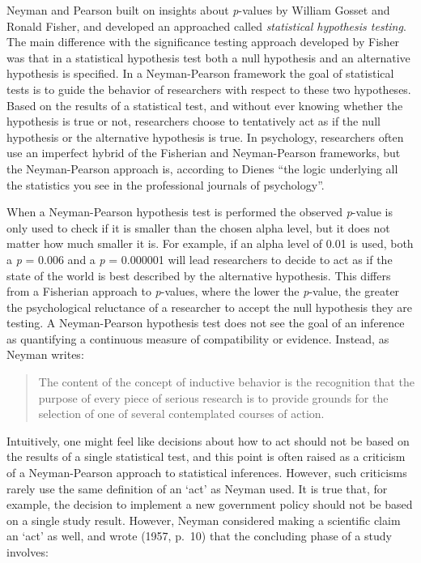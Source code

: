 \documentclass[
  oneside]{book}
\begin{document}
Neyman and Pearson built on insights about \emph{p}-values by William Gosset and Ronald Fisher, and developed an approached called \emph{statistical hypothesis testing}. The main difference with the significance testing approach developed by Fisher was that in a statistical hypothesis test both a null hypothesis and an alternative hypothesis is specified. In a Neyman-Pearson framework the goal of statistical tests is to guide the behavior of researchers with respect to these two hypotheses. Based on the results of a statistical test, and without ever knowing whether the hypothesis is true or not, researchers choose to tentatively act as if the null hypothesis or the alternative hypothesis is true. In psychology, researchers often use an imperfect hybrid of the Fisherian and Neyman-Pearson frameworks, but the Neyman-Pearson approach is, according to Dienes \citet{dienes_understanding_2008} ``the logic underlying all the statistics you see in the professional journals of psychology''.

When a Neyman-Pearson hypothesis test is performed the observed \emph{p}-value is only used to check if it is smaller than the chosen alpha level, but it does not matter how much smaller it is. For example, if an alpha level of 0.01 is used, both a \emph{p} = 0.006 and a \emph{p} = 0.000001 will lead researchers to decide to act as if the state of the world is best described by the alternative hypothesis. This differs from a Fisherian approach to \emph{p}-values, where the lower the \emph{p}-value, the greater the psychological reluctance of a researcher to accept the null hypothesis they are testing. A Neyman-Pearson hypothesis test does not see the goal of an inference as quantifying a continuous measure of compatibility or evidence. Instead, as Neyman \citeyearpar{neyman_inductive_1957} writes:

\begin{quote}
The content of the concept of inductive behavior is the recognition that the purpose of every piece of serious research is to provide grounds for the selection of one of several contemplated courses of action.
\end{quote}

Intuitively, one might feel like decisions about how to act should not be based on the results of a single statistical test, and this point is often raised as a criticism of a Neyman-Pearson approach to statistical inferences. However, such criticisms rarely use the same definition of an `act' as Neyman used. It is true that, for example, the decision to implement a new government policy should not be based on a single study result. However, Neyman considered making a scientific claim an `act' as well, and wrote (1957, p.~10) that the concluding phase of a study involves:
\end{document}
